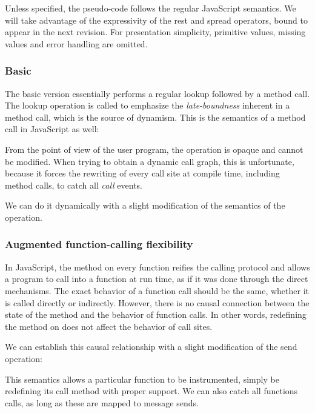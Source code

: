 Unless specified, the pseudo-code follows the regular JavaScript semantics. We
will take advantage of the expressivity of the rest and spread operators, bound
to appear in the next revision. For presentation simplicity, primitive values,
missing values and error handling are omitted.

\subsubsection{Basic}

The basic version essentially performs a regular lookup followed by a method
call. The lookup operation is called  to emphasize the
\textit{late-boundness} inherent in a method call, which is the source of
dynamism. This is the semantics of a method call in JavaScript as well:


From the point of view of the user program, the  operation is opaque
and cannot be modified. When trying to obtain a dynamic call graph, this is
unfortunate, because it forces the rewriting of every call site at compile
time, including method calls, to catch all \textit{call} events.

We can do it dynamically with a slight modification of the semantics of the
operation.

\subsubsection{Augmented function-calling flexibility}
\label{sec:AugmentedFunctionCalling}

In JavaScript, the  method on every function reifies the calling
protocol and allows a program to call into a function at run time, as if it was
done through the direct mechanisms. The exact behavior of a function call should be
the same, whether it is called directly or indirectly. However, there is no
causal connection between the state of the  method and the behavior
of function calls. In other words, redefining the  method on
 does not affect the behavior of call sites.

We can establish this causal relationship with a slight modification of the
send operation:


This semantics allows a particular function to be instrumented, simply be
redefining its call method with proper support. We can also catch all functions
calls, as long as these are mapped to message sends.

